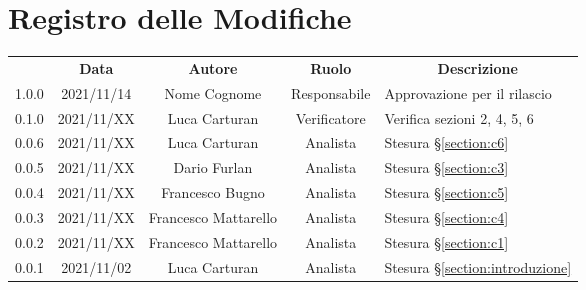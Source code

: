 \thispagestyle{empty}
\section*{Registro delle Modifiche}

\begin{center}
\renewcommand{\arraystretch}{1.8}
\begin{longtable}[c]{c | c | c | c | p{5cm}}
\rowcolor[HTML]{125E28}
\multicolumn{1}{c}{\color[HTML]{FFFFFF} \textbf{Versione}} & 
\multicolumn{1}{c}{\color[HTML]{FFFFFF} \textbf{Data}} & 
\multicolumn{1}{c}{\color[HTML]{FFFFFF} \textbf{Autore}} & 
\multicolumn{1}{c}{\color[HTML]{FFFFFF} \textbf{Ruolo}} & 
\multicolumn{1}{c}{\color[HTML]{FFFFFF} \textbf{Descrizione}} \\

1.0.0 & 2021/11/14 & Nome Cognome & Responsabile & Approvazione per il rilascio \\ \hline

0.1.0 & 2021/11/XX & Luca Carturan & Verificatore & Verifica sezioni 2, 4, 5, 6 \\ \hline
0.0.6 & 2021/11/XX & Luca Carturan & Analista & Stesura §\ref{section:c6} \\ \hline
0.0.5 & 2021/11/XX & Dario Furlan & Analista & Stesura §\ref{section:c3} \\ \hline
0.0.4 & 2021/11/XX & Francesco Bugno & Analista & Stesura §\ref{section:c5} \\ \hline
0.0.3 & 2021/11/XX & Francesco Mattarello & Analista & Stesura §\ref{section:c4} \\ \hline
0.0.2 & 2021/11/XX & Francesco Mattarello & Analista & Stesura §\ref{section:c1} \\ \hline
0.0.1 & 2021/11/02 & Luca Carturan & Analista & Stesura §\ref{section:introduzione} \\

\end{longtable}

\end{center}